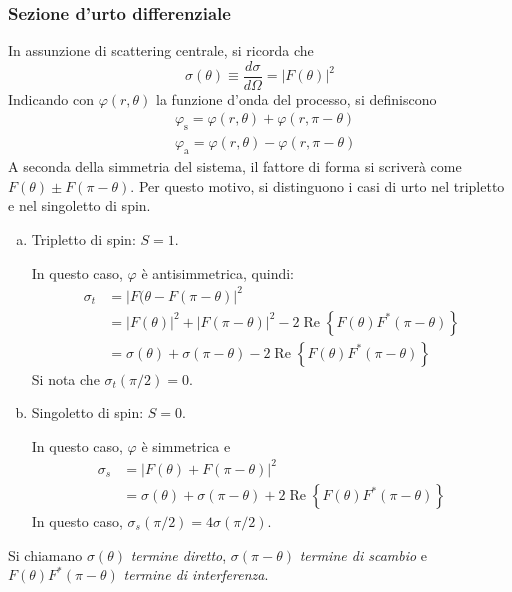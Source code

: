 \documentclass[11pt, a4paper]{scrartcl}
\theoremstyle{style}
\numberwithin{equation}{subsection}
\begin{document}
\subsubsection{Sezione d'urto differenziale}

In assunzione di scattering centrale, si ricorda che 
\[
\sigma (\theta ) \equiv \frac{d \sigma }{d \Omega }  = \lvert F(\theta ) \rvert ^2
\] 
Indicando con $\varphi (r,\theta )$ la funzione d'onda del processo, si definiscono
\begin{align}
		&\varphi _\text{s} = \varphi (r,\theta ) + \varphi (r,\pi - \theta )\tag{simmetrica}\\
		&\varphi _\text{a} = \varphi (r,\theta ) - \varphi (r,\pi- \theta ) \tag{antisimmetrica}
\end{align}
A seconda della simmetria del sistema, il fattore di forma si scriver\`a come $F(\theta ) \pm F(\pi-\theta )$.
Per questo motivo, si distinguono i casi di urto nel tripletto e nel singoletto di spin.
\begin{enumerate}[(a).]
	\item Tripletto di spin: $S=1$.

		In questo caso, $\varphi $ \`e antisimmetrica, quindi:
		\[
		\begin{split}
			\sigma _t &= \lvert F(\theta  - F(\pi-\theta ) \rvert ^2 \\
				  &= \lvert F(\theta ) \rvert ^2 + \lvert F(\pi-\theta ) \rvert ^2 - 2 \operatorname{Re} \left\{ F(\theta )F^*(\pi-\theta ) \right\} \\
				  & = \sigma (\theta ) + \sigma (\pi-\theta ) - 2 \operatorname{Re}  \left\{ F(\theta ) F^*(\pi - \theta ) \right\} 
		\end{split}
		\] 
	Si nota che $\sigma_t (\pi / 2) = 0$.
\item Singoletto di spin: $S=0$.


	In questo caso, $\varphi $ \`e simmetrica e 
	\[
	\begin{split}
		\sigma _s &= \lvert F(\theta ) + F(\pi-\theta ) \rvert ^2 \\
			  & = \sigma (\theta ) + \sigma (\pi-\theta ) + 2 \operatorname{Re} \left\{ F(\theta ) F^*(\pi-\theta ) \right\} 
	\end{split}
	\] 
	In questo caso, $\sigma _s (\pi / 2) = 4 \sigma  ( \pi / 2)$.
\end{enumerate}
Si chiamano $\sigma (\theta )$ \textit{termine diretto}, $\sigma (\pi-\theta )$ \textit{termine di scambio} e $F(\theta )F^*(\pi-\theta )$ \textit{termine di interferenza}.
\end{document}
